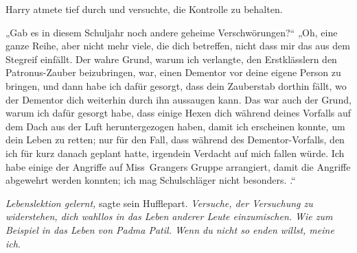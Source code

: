 Harry atmete tief durch und versuchte, die Kontrolle zu behalten.

„Gab es in diesem Schuljahr noch andere geheime Verschwörungen?“
„Oh, eine ganze Reihe, aber nicht mehr viele, die dich betreffen, nicht dass mir das aus dem Stegreif einfällt. Der wahre Grund, warum ich verlangte, den Erstklässlern den Patronus-Zauber beizubringen, war, einen Dementor vor deine eigene Person zu bringen, und dann habe ich dafür gesorgt, dass dein Zauberstab dorthin fällt, wo der Dementor dich weiterhin durch ihn aussaugen kann.  Das war auch der Grund, warum ich dafür gesorgt habe, dass einige Hexen dich während deines Vorfalls auf dem Dach aus der Luft heruntergezogen haben, damit ich erscheinen konnte, um dein Leben zu retten; nur für den Fall, dass während des Dementor-Vorfalls, den ich für kurz danach geplant hatte, irgendein Verdacht auf mich fallen würde.  Ich habe einige der Angriffe auf Miss~Grangers Gruppe arrangiert, damit die Angriffe abgewehrt werden konnten; ich mag Schulschläger nicht besonders. .“

\emph{Lebenslektion gelernt,} sagte sein Hufflepart. \emph{Versuche, der Versuchung zu widerstehen, dich wahllos in das Leben anderer Leute einzumischen. Wie zum Beispiel in das Leben von Padma Patil. Wenn du nicht so enden willst, meine ich}.

